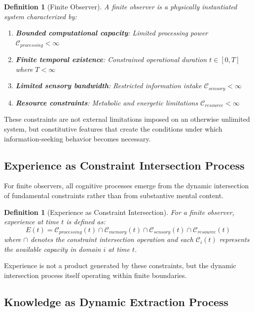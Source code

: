 \documentclass[12pt,a4paper]{article}
\newtheorem{definition}[theorem]{Definition}
\begin{document}
\begin{definition}[Finite Observer]
A finite observer is a physically instantiated system characterized by:
\begin{enumerate}
\item \textbf{Bounded computational capacity}: Limited processing power $\mathcal{C}_{processing} < \infty$
\item \textbf{Finite temporal existence}: Constrained operational duration $t \in [0,T]$ where $T < \infty$
\item \textbf{Limited sensory bandwidth}: Restricted information intake $\mathcal{C}_{sensory} < \infty$
\item \textbf{Resource constraints}: Metabolic and energetic limitations $\mathcal{C}_{resource} < \infty$
\end{enumerate}
\end{definition}

These constraints are not external limitations imposed on an otherwise unlimited system, but constitutive features that create the conditions under which information-seeking behavior becomes necessary.

\subsection{Experience as Constraint Intersection Process}

For finite observers, all cognitive processes emerge from the dynamic intersection of fundamental constraints rather than from substantive mental content.

\begin{definition}[Experience as Constraint Intersection]
For a finite observer, experience at time $t$ is defined as:
\begin{equation}
E(t) = \mathcal{C}_{processing}(t) \cap \mathcal{C}_{memory}(t) \cap \mathcal{C}_{sensory}(t) \cap \mathcal{C}_{resource}(t)
\end{equation}
where $\cap$ denotes the constraint intersection operation and each $\mathcal{C}_i(t)$ represents the available capacity in domain $i$ at time $t$.
\end{definition}

Experience is not a product generated by these constraints, but the dynamic intersection process itself operating within finite boundaries.

\subsection{Knowledge as Dynamic Extraction Process}
\end{document}
